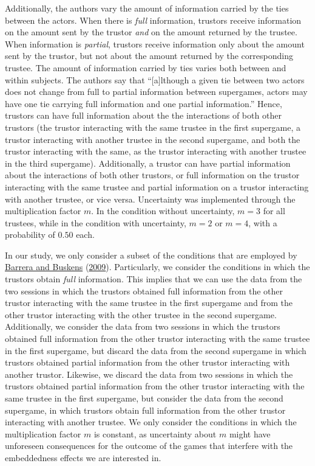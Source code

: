 \documentclass[
  11pt,
]{article}
\begin{document}
Additionally, the authors vary the amount of information carried by the ties between the actors. When there is \emph{full} information, trustors receive information on the amount sent by the trustor \emph{and} on the amount returned by the trustee. When information is \emph{partial}, trustors receive information only about the amount sent by the trustor, but not about the amount returned by the corresponding trustee. The amount of information carried by ties varies both between and within subjects. The authors say that ``{[}a{]}lthough a given tie between two actors does not change from full to partial information between supergames, actors may have one tie carrying full information and one partial information.'' Hence, trustors can have full information about the the interactions of both other trustors (the trustor interacting with the same trustee in the first supergame, a trustor interacting with another trustee in the second supergame, and both the trustor interacting with the same, as the trustor interacting with another trustee in the third supergame). Additionally, a trustor can have partial information about the interactions of both other trustors, or full information on the trustor interacting with the same trustee and partial information on a trustor interacting with another trustee, or vice versa. Uncertainty was implemented through the multiplication factor \(m\). In the condition without uncertainty, \(m = 3\) for all trustees, while in the condition with uncertainty, \(m = 2\) or \(m = 4\), with a probability of \(0.50\) each.

In our study, we only consider a subset of the conditions that are employed by \protect\hyperlink{ref-barrera_buskens_third_2009}{Barrera and Buskens} (\protect\hyperlink{ref-barrera_buskens_third_2009}{2009}). Particularly, we consider the conditions in which the trustors obtain \emph{full} information.
This implies that we can use the data from the two sessions in which the trustors obtained full information from the other trustor interacting with the same trustee in the first supergame and from the other trustor interacting with the other trustee in the second supergame.
Additionally, we consider the data from two sessions in which the trustors obtained full information from the other trustor interacting with the same trustee in the first supergame, but discard the data from the second supergame in which trustors obtained partial information from the other trustor interacting with another trustor.
Likewise, we discard the data from two sessions in which the trustors obtained partial information from the other trustor interacting with the same trustee in the first supergame, but consider the data from the second supergame, in which trustors obtain full information from the other trustor interacting with another trustee.
We only consider the conditions in which the multiplication factor \(m\) is constant, as uncertainty about \(m\) might have unforeseen consequences for the outcome of the games that interfere with the embeddedness effects we are interested in.
\end{document}
